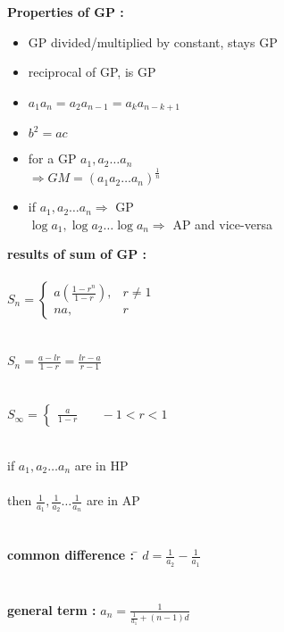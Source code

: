 \documentclass[11pt,a4paper,landscape]{article}
\begin{document}
\begin{multicols}{3}
{\bfseries \noindent Properties of GP :} 
\begin{itemize}
  	\item GP divided/multiplied by constant, stays GP
	\item reciprocal of GP, is GP
	\item $a_1 a_n = a_2 a_{n-1} = a_k a_{n-k+1}$
	\item $b^2 = ac$
	\item for a GP $a_1, a_2 \ldots a_n$\\
		$\Rightarrow GM = \left({a_1 a_2 \ldots a_n} \right)^{\frac{1}{n}}$
	\item if  $a_1,a_2 \ldots a_n \Rightarrow$ GP \\
		$\log a_1, \log a_2 \ldots \log a_n \Rightarrow$ AP and vice-versa
\end{itemize}
{\bfseries \noindent results of sum of GP :} \\\\
$
	S_n =
	\begin{cases}
	a\left(\displaystyle \frac{1-r^{n}}{1-r} \right), & r \neq 1\\
	na, & r
	\end{cases}
$\\ \\ \\
$
	S_n = \displaystyle \frac{a -lr}{1-r}=  \displaystyle \frac{lr-a}{r-1}
$\\ \\ \\
$
	S_\infty =
	\begin{cases}
		\displaystyle \frac{a}{1-r} & \quad -1<r<1
	\end{cases}
$\\
\begin{tabbing}
{\bfseries {}}\\
if $a_1,a_2 \ldots a_n$ are in HP\\ \\
then $\displaystyle \frac{1}{a_1},\frac{1}{a_2} \ldots \frac{1}{a_n}$ are in AP\\ \\ \\
{\bfseries \noindent common difference : }\hspace{2mm} \= $d = \frac{1}{a_2}-\frac{1}{a_1}$\\ \\ \\
{\bfseries \noindent general term : }\> $a_n = \frac{1}{\displaystyle \frac{1}{a_1}+(n-1)d}$
\end{tabbing}

\end{multicols}
\end{document}

